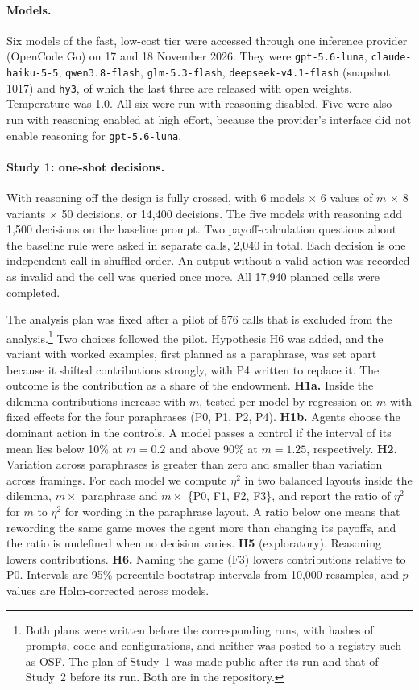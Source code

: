 \documentclass[runningheads]{llncs}
\begin{document}
\paragraph{Models.} {\sloppy Six models of the fast, low-cost tier were accessed through one inference provider (OpenCode Go) on 17 and 18 November 2026. They were \texttt{gpt-5.6-luna}, \texttt{claude-haiku-5-5}, \texttt{qwen3.8-flash}, \texttt{glm-5.3-flash}, \texttt{deepseek-v4.1-flash} (snapshot 1017) and \texttt{hy3}, of which the last three are released with open weights. Temperature was 1.0. All six were run with reasoning disabled. Five were also run with reasoning enabled at high effort, because the provider's interface did not enable reasoning for \texttt{gpt-5.6-luna}.\par}

\paragraph{Study 1: one-shot decisions.} With reasoning off the design is fully crossed, with 6 models $\times$ 6 values of $m$ $\times$ 8 variants $\times$ 50 decisions, or 14,400 decisions. The five models with reasoning add 1,500 decisions on the baseline prompt. Two payoff-calculation questions about the baseline rule were asked in separate calls, 2,040 in total. Each decision is one independent call in shuffled order. An output without a valid action was recorded as invalid and the cell was queried once more. All 17,940 planned cells were completed.

The analysis plan was fixed after a pilot of 576 calls that is excluded from the analysis.\footnote{Both plans were written before the corresponding runs, with hashes of prompts, code and configurations, and neither was posted to a registry such as OSF. The plan of Study~1 was made public after its run and that of Study~2 before its run. Both are in the repository.} Two choices followed the pilot. Hypothesis H6 was added, and the variant with worked examples, first planned as a paraphrase, was set apart because it shifted contributions strongly, with P4 written to replace it. The outcome is the contribution as a share of the endowment. \textbf{H1a.} Inside the dilemma contributions increase with $m$, tested per model by regression on $m$ with fixed effects for the four paraphrases (P0, P1, P2, P4). \textbf{H1b.} Agents choose the dominant action in the controls. A model passes a control if the interval of its mean lies below 10\% at $m=0.2$ and above 90\% at $m=1.25$, respectively. \textbf{H2.} Variation across paraphrases is greater than zero and smaller than variation across framings. For each model we compute $\eta^2$ in two balanced layouts inside the dilemma, $m \times$ paraphrase and $m \times$ \{P0, F1, F2, F3\}, and report the ratio of $\eta^2$ for $m$ to $\eta^2$ for wording in the paraphrase layout. A ratio below one means that rewording the same game moves the agent more than changing its payoffs, and the ratio is undefined when no decision varies. \textbf{H5} (exploratory). Reasoning lowers contributions. \textbf{H6.} Naming the game (F3) lowers contributions relative to P0. Intervals are 95\% percentile bootstrap intervals from 10,000 resamples, and $p$-values are Holm-corrected across models.
\end{document}
